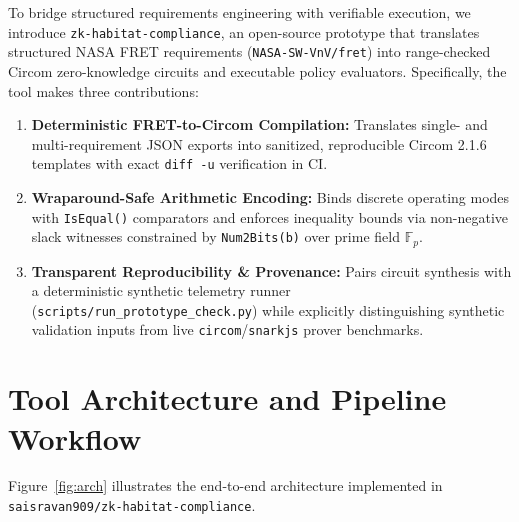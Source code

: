 \documentclass[runningheads]{llncs}
\begin{document}
To bridge structured requirements engineering with verifiable execution, we introduce \texttt{zk-habitat-compliance}, an open-source prototype that translates structured NASA FRET requirements (\texttt{NASA-SW-VnV/fret}) \cite{fret_repo,fret_ntrs} into range-checked Circom zero-knowledge circuits and executable policy evaluators. Specifically, the tool makes three contributions:
\begin{enumerate}
    \item \textbf{Deterministic FRET-to-Circom Compilation:} Translates single- and multi-requirement JSON exports into sanitized, reproducible Circom 2.1.6 templates with exact \texttt{diff -u} verification in CI.
    \item \textbf{Wraparound-Safe Arithmetic Encoding:} Binds discrete operating modes with \texttt{IsEqual()} comparators and enforces inequality bounds via non-negative slack witnesses constrained by \texttt{Num2Bits(b)} over prime field $\mathbb{F}_p$.
    \item \textbf{Transparent Reproducibility \& Provenance:} Pairs circuit synthesis with a deterministic synthetic telemetry runner (\texttt{scripts/run\_prototype\_check.py}) while explicitly distinguishing synthetic validation inputs from live \texttt{circom}/\texttt{snarkjs} prover benchmarks.
\end{enumerate}

\section{Tool Architecture and Pipeline Workflow}
Figure~\ref{fig:arch} illustrates the end-to-end architecture implemented in \texttt{saisravan909/zk-habitat-compliance}.
\end{document}
